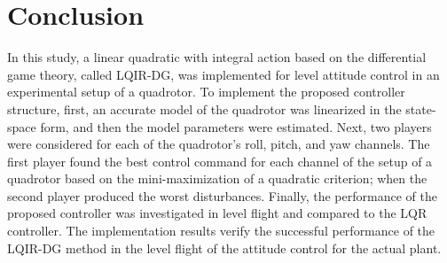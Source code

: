 \documentclass[3p,times]{elsarticle}
\begin{document}
\section{Conclusion}\label{sec:conclusion}
\noindent In this study, a linear quadratic with integral action based on the differential game theory, called LQIR-DG, was implemented for level attitude control in an experimental setup of a quadrotor. To implement the proposed controller structure, first, an accurate model of the quadrotor was linearized in the state-space form, and then the model parameters were estimated. Next, two players were considered for each of the quadrotor's roll, pitch, and yaw channels. The first player found the best control command for each channel of the setup of a quadrotor based on the mini-maximization of a quadratic criterion; when the second player produced the worst disturbances. Finally, the performance of the proposed controller was investigated in level flight and compared to the LQR controller. The implementation results verify the successful performance of the LQIR-DG method in the level flight of the attitude control for the actual plant.

















\end{document}
